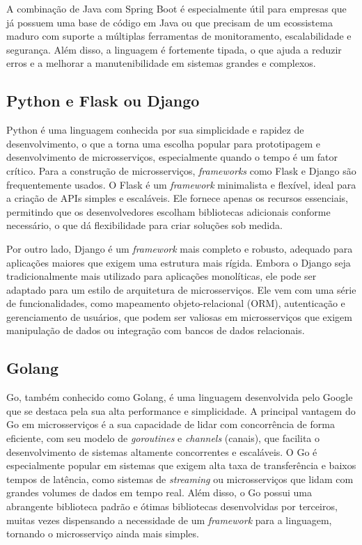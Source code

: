 A combinação de Java com Spring Boot é especialmente útil para empresas que já possuem uma base de código em Java ou que precisam de um ecossistema maduro com suporte a múltiplas ferramentas de monitoramento, escalabilidade e segurança. Além disso, a linguagem é fortemente tipada, o que ajuda a reduzir erros e a melhorar a manutenibilidade em sistemas grandes e complexos.

\subsection{Python e Flask ou Django}

Python é uma linguagem conhecida por sua simplicidade e rapidez de desenvolvimento, o que a torna uma escolha popular para prototipagem e desenvolvimento de microsserviços, especialmente quando o tempo é um fator crítico. Para a construção de microsserviços, \emph{frameworks} como Flask e Django são frequentemente usados. O Flask é um \emph{framework} minimalista e flexível, ideal para a criação de APIs simples e escaláveis. Ele fornece apenas os recursos essenciais, permitindo que os desenvolvedores escolham bibliotecas adicionais conforme necessário, o que dá flexibilidade para criar soluções sob medida. 
\cite{flask}

Por outro lado, Django é um \emph{framework} mais completo e robusto, adequado para aplicações maiores que exigem uma estrutura mais rígida. Embora o Django seja tradicionalmente mais utilizado para aplicações monolíticas, ele pode ser adaptado para um estilo de arquitetura de microsserviços. Ele vem com uma série de funcionalidades, como mapeamento objeto-relacional (ORM), autenticação e gerenciamento de usuários, que podem ser valiosas em microsserviços que exigem manipulação de dados ou integração com bancos de dados relacionais. 
\cite{django}

\subsection{Golang}

Go, também conhecido como Golang, é uma linguagem desenvolvida pelo Google que se destaca pela sua alta performance e simplicidade. A principal vantagem do Go em microsserviços é a sua capacidade de lidar com concorrência de forma eficiente, com seu modelo de \emph{goroutines} e \emph{channels} (canais), que facilita o desenvolvimento de sistemas altamente concorrentes e escaláveis. O Go é especialmente popular em sistemas que exigem alta taxa de transferência e baixos tempos de latência, como sistemas de \emph{streaming} ou microsserviços que lidam com grandes volumes de dados em tempo real. Além disso, o Go possui uma abrangente biblioteca padrão e ótimas bibliotecas desenvolvidas por terceiros, muitas vezes dispensando a necessidade de um \emph{framework} para a linguagem, tornando o microsserviço ainda mais simples.
\cite{golang}

